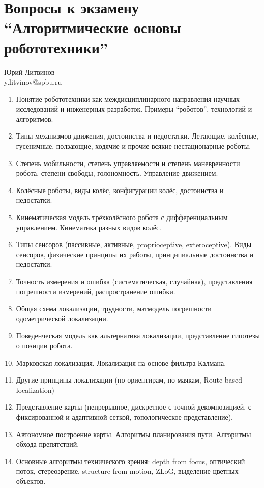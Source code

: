 \documentclass[a5paper]{article}
\begin{document}
\thispagestyle{empty}

\section*{Вопросы к экзамену \enquote{Алгоритмические основы робототехники}}

\begin{flushright}\begin{small}Юрий Литвинов\\\small{y.litvinov@spbu.ru}\end{small}\end{flushright}

\begin{enumerate}
    \item Понятие робототехники как междисциплинарного направления научных исследований и инженерных разработок. Примеры \enquote{роботов}, технологий и алгоритмов. 
    \item Типы механизмов движения, достоинства и недостатки. Летающие, колёсные, гусеничные, ползающие,  ходячие  и прочие всякие нестационарные роботы.
    \item Степень мобильности, степень управляемости и степень маневренности робота, степени свободы, голономность. Управление движением.  
    \item Колёсные роботы, виды колёс, конфигурации колёс, достоинства и недостатки.
    \item Кинематическая модель трёхколёсного робота с дифференциальным управлением. Кинематика разных видов колёс.
    \item Типы сенсоров (пассивные, активные, proprioceptive, exteroceptive). Виды сенсоров, физические принципы их работы, принципиальные достоинства и недостатки.
    \item Точность измерения и ошибка (систематическая, случайная), представления погрешности измерений, распространение ошибки.
    \item Общая схема локализации, трудности, матмодель погрешности одометрической локализации.
    \item Поведенческая модель как альтернатива локализации, представление гипотезы о позиции робота.
    \item Марковская локализация. Локализация на основе фильтра Калмана. 
    \item Другие принципы локализации (по ориентирам, по маякам, Route-based localization)
    \item Представление карты (непрерывное, дискретное с точной декомпозицией, с фиксированной и адаптивной сеткой, топологическое представление). 
    \item Автономное построение карты. Алгоритмы планирования пути. Алгоритмы обхода препятствий.
    \item Основные алгоритмы технического зрения: depth from focus, оптический поток, стереозрение, structure from motion, ZLoG, выделение цветных объектов.
\end{enumerate}
\end{document}
